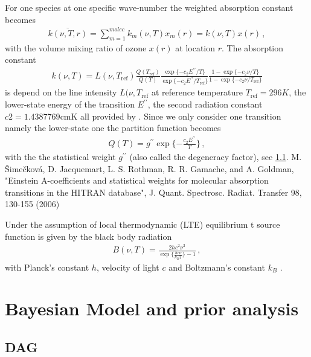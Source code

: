 For one species at one specific wave-number the weighted absorption constant becomes
\begin{align}
	\overline{k(\nu, T, r)}    = \sum_{m=1}^{molec} k_m(\nu, T) x_m(r) =  k(\nu, T) x(r) \, ,
\end{align}
with the volume mixing ratio of ozone $x(r)$ at location $r$. 
The absorption constant
\begin{align}
	k(\nu, T) = L(\nu, T_{\text{ref}}) \frac{Q(T_{\text{ref}})}{Q(T)} \frac{ \exp{\{ - c_2 E^{\prime \prime} / T\}} }{\exp{\{ - c_2 E^{\prime \prime} / T_{\text{ref}} \}}} \frac{ 1- \exp{\{ - c_2 \nu  / T \}} }{1 - \exp{\{ - c_2 \nu / T_{\text{ref}} \}}}
\end{align}
is depend on the line intensity $L(\nu, T_{\text{ref}}$ at reference temperature $T_{\text{ref}} =296K $, the lower-state energy of the transition $ E^{\prime \prime} $, the second radiation constant $c2=1.4387769\text{cmK}$ all provided by \cite{}.
Since we only consider one transition namely the lower-state one the partition function becomes
\begin{align}
	Q(T )= g^{\prime \prime} \exp{\{ - \frac{ c_2 E^{\prime \prime} }{T}\}} \, ,
\end{align}
with the the statistical weight $ g^{\prime \prime}$ (also called the degeneracy factor), see \ref{}.
M. Šimečková, D. Jacquemart, L. S. Rothman, R. R. Gamache, and A. Goldman, "Einstein A-coefficients and statistical weights for molecular absorption transitions in the HITRAN database", J. Quant. Spectrosc. Radiat. Transfer 98, 130-155 (2006)

Under the assumption of local thermodynamic (LTE) equilibrium t source function is given by the black body radiation
\begin{align}
	B(\nu,T)   = \frac{2 h c^2 \nu^3}{\exp{\{\frac{hc\nu}{k_B T}\}}-1}\, ,
\end{align}
with Planck's constant $h$, velocity of light $c$ and Boltzmann's constant $k_B$ \cite{}.




\section{Bayesian Model and prior analysis}


\subsection{DAG}

